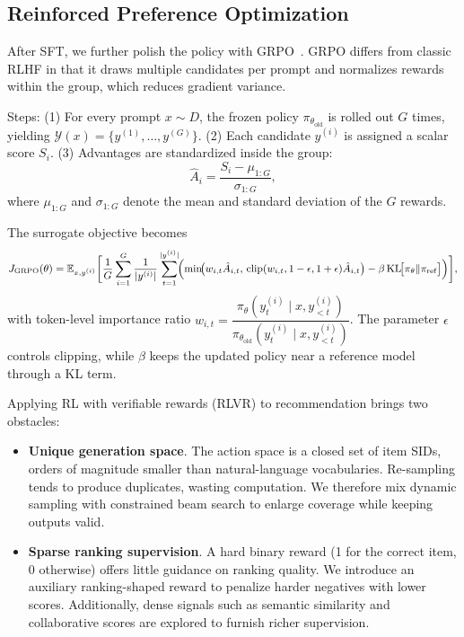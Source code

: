 \subsection{Reinforced Preference Optimization} \label{sec:optimization}
After SFT, we further polish the policy with GRPO~\citep{deepseekmath,deepseek}. GRPO differs from classic RLHF in that it draws multiple candidates per prompt and normalizes rewards within the group, which reduces gradient variance.

Steps:
(1) For every prompt $x\!\sim\!D$, the frozen policy $\pi_{\theta_{\text{old}}}$ is rolled out $G$ times, yielding $\mathcal{Y}(x)=\{y^{(1)},\ldots,y^{(G)}\}$.  
(2) Each candidate $y^{(i)}$ is assigned a scalar score $S_i$.  
(3) Advantages are standardized inside the group:
\[
\hat{A}_i=\frac{S_i-\mu_{1:G}}{\sigma_{1:G}},
\]
where $\mu_{1:G}$ and $\sigma_{1:G}$ denote the mean and standard deviation of the $G$ rewards.

The surrogate objective becomes
\[
\small
\begin{aligned}
J_{\text{GRPO}}(\theta)=
\mathbb{E}_{x,y^{(i)}}
\biggl[
\frac{1}{G}\sum_{i=1}^{G}\frac{1}{|y^{(i)}|}
\sum_{t=1}^{|y^{(i)}|}
\!\Bigl(
\min\!\bigl(w_{i,t}\hat{A}_{i,t},\,
\operatorname{clip}(w_{i,t},1-\epsilon,1+\epsilon)\hat{A}_{i,t}\bigr)
-\beta\,\mathrm{KL}\!\bigl[\pi_\theta\|\pi_{\text{ref}}\bigr]
\Bigr)
\biggr],
\end{aligned}
\]
with token-level importance ratio  
$w_{i,t}= \dfrac{\pi_\theta(y^{(i)}_t\!\mid\!x,y^{(i)}_{<t})}
                 {\pi_{\theta_{\text{old}}}(y^{(i)}_t\!\mid\!x,y^{(i)}_{<t})}$.
The parameter $\epsilon$ controls clipping, while $\beta$ keeps the updated policy near a reference model through a KL term.


Applying RL with verifiable rewards (RLVR) to recommendation brings two obstacles:

\begin{itemize}
    \item \textbf{Unique generation space}. The action space is a closed set of item SIDs, orders of magnitude smaller than natural-language vocabularies. Re-sampling tends to produce duplicates, wasting computation. We therefore mix dynamic sampling \citep{DAPO} with constrained beam search to enlarge coverage while keeping outputs valid.
    \item \textbf{Sparse ranking supervision}. A hard binary reward (1 for the correct item, 0 otherwise) offers little guidance on ranking quality. We introduce an auxiliary ranking-shaped reward to penalize harder negatives with lower scores. Additionally, dense signals such as semantic similarity and collaborative scores are explored to furnish richer supervision.
\end{itemize}
